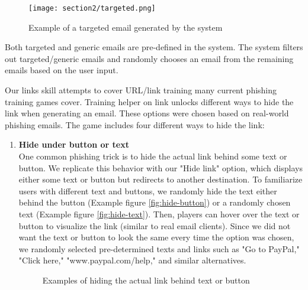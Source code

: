 \begin{figure}[ht]
    \centering
    \texttt{[image: section2/targeted.png]}
    \caption{Example of a targeted email generated by the system}
\end{figure}

Both targeted and generic emails are pre-defined in the system. The system filters out targeted/generic emails and randomly chooses an email from the remaining emails based on the user input.

Our links skill attempts to cover URL/link training many current phishing training games cover. Training helper on link unlocks different ways to hide the link when generating an email. These options were chosen based on real-world phishing emails. The game includes four different ways to hide the link:

\begin{enumerate}
    \item \textbf{Hide under button or text}\\
          One common phishing trick is to hide the actual link behind some text or button. We replicate this behavior with our "Hide link" option, which displays either some text or button but redirects to another destination. To familiarize users with different text and buttons, we randomly hide the text either behind the button (Example figure \ref{fig:hide-button}) or a randomly chosen text (Example figure \ref{fig:hide-text}). Then, players can hover over the text or button to visualize the link (similar to real email clients). Since we did not want the text or button to look the same every time the option was chosen, we randomly selected pre-determined texts and links such as "Go to PayPal," "Click here," "www.paypal.com/help," and similar alternatives.

          \begin{figure}[ht]
              \hfill
              \caption{Examples of hiding the actual link behind text or button}
          \end{figure}


\end{enumerate}
